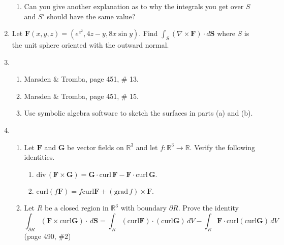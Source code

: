 \documentclass{article}
\newcommand{\divt}{\text{div} \,}
\begin{document}
\begin{enumerate}
\begin{enumerate}
        \item Can you give another explanation as to why the integrals you get over $S$ and $S'$ should have the same value?

    \end{enumerate}
    
    \newpage
    \item Let $\boldsymbol F (x,y,z) = (e^{z^2}, 4z-y, 8x \sin y)$. Find $\displaystyle \int_S (\nabla \times \boldsymbol F)\cdot d\boldsymbol S$ where $S$ is the unit sphere oriented with the outward normal.

    \newpage
    \item 
    \begin{enumerate}
        \item Marsden \& Tromba, page 451, \# 13.
        \item Marsden \& Tromba, page 451, \# 15.
        \item Use symbolic algebra software to sketch the surfaces in parts (a) and (b).
    \end{enumerate}
    
    \newpage
    \item 
    \begin{enumerate}
        \item Let $\boldsymbol F$ and $\boldsymbol G$ be vector fields on $\mathbb{R}^3$ and let $f : \mathbb{R}^3 \rightarrow \mathbb{R}$. Verify the following identities.
        \begin{enumerate}[label=(\roman*)]
            \item $\divt (\boldsymbol F \times \boldsymbol G) = \boldsymbol G \cdot \text{curl} \, \boldsymbol F - \boldsymbol F \cdot \text{curl} \, \boldsymbol G.$
            \item curl$(f \boldsymbol F) = f \text{curl} \boldsymbol F + (\text{grad}\, f) \times \boldsymbol F$.
        \end{enumerate}
        \item Let $R$ be a closed region in $\mathbb{R}^3$ with boundary $\partial R$. Prove the identity
        \[\int_{\partial R} ( \boldsymbol F \times \text{curl} \boldsymbol G) \cdot \, d \boldsymbol S = \int_R(\text{curl} \boldsymbol F ) \cdot (\text{curl} \boldsymbol G) \, dV - \int_R \boldsymbol F \cdot \text{curl}(\text{curl} \boldsymbol G ) \, dV\]
        (page 490, \#2)
    \end{enumerate}
\end{enumerate}
\end{document}
